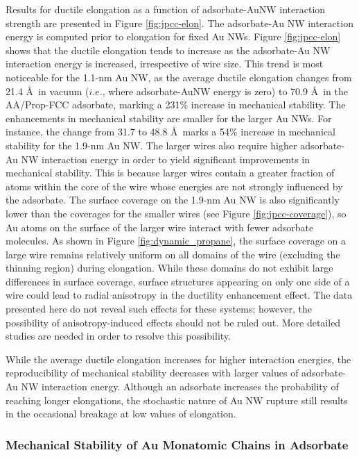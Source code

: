 \documentclass[10pt]{report}  %
\newcommand\findent{\hspace*{\parindent}}
\begin{document}
\findent Results for ductile elongation as a function of adsorbate-AuNW interaction strength are presented in Figure \ref{fig:jpcc-elon}.  The adsorbate-Au NW interaction energy is computed prior to elongation for fixed Au NWs.  Figure \ref{fig:jpcc-elon} shows that the ductile elongation tends to increase as the adsorbate-Au NW interaction energy is increased, irrespective of wire size.  This trend is most noticeable for the 1.1-nm Au NW, as the average ductile elongation changes from 21.4 \AA\ in vacuum ($i.e.$, where adsorbate-AuNW energy is zero) to 70.9 \AA\ in the AA/Prop-FCC adsorbate, marking a 231\% increase in mechanical stability.  The enhancements in mechanical stability are smaller for the larger Au NWs.  For instance, the change from 31.7 to 48.8 \AA\ marks a 54\% increase in mechanical stability for the 1.9-nm Au NW.  The larger wires also require higher adsorbate-Au NW interaction energy in order to yield significant improvements in mechanical stability.  This is because larger wires contain a greater fraction of atoms within the core of the wire whose energies are not strongly influenced by the adsorbate.  The surface coverage on the 1.9-nm Au NW is also significantly lower than the coverages for the smaller wires (see Figure \ref{fig:jpcc-coverage}), so Au atoms on the surface of the larger wire interact with fewer adsorbate molecules.  As shown in Figure \ref{fig:dynamic_propane}, the surface coverage on a large wire remains relatively uniform on all domains of the wire (excluding the thinning region) during elongation.  While these domains do not exhibit large differences in surface coverage, surface structures appearing on only one side of a wire could lead to radial anisotropy in the ductility enhancement effect.  The data presented here do not reveal such effects for these systems; however, the possibility of anisotropy-induced effects should not be ruled out.  More detailed studies are needed in order to resolve this possibility.    

While the average ductile elongation increases for higher interaction energies, the reproducibility of mechanical stability decreases with larger values of adsorbate-Au NW interaction energy.  Although an adsorbate increases the probability of reaching longer elongations, the stochastic nature of Au NW rupture still results in the occasional breakage at low values of elongation.

\subsubsection{Mechanical Stability of Au Monatomic Chains in Adsorbate}
\end{document}
